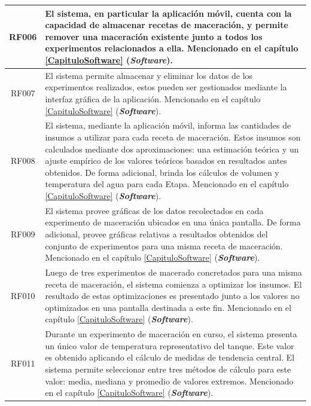 \begin{longtable}{|p{3cm}|p{11cm}|}
        \multicolumn{1}{|c|}{RF006}  & El sistema, en particular la aplicación móvil, cuenta con la capacidad de almacenar recetas de maceración, y permite remover una maceración existente junto a todos los experimentos relacionados a ella. Mencionado en el capítulo \ref{CapituloSoftware} (\textit{\textbf{Software}}). \\
        \hline
        
        \multicolumn{1}{|c|}{RF007} & El sistema permite almacenar y eliminar los datos de los experimentos realizados, estos pueden ser gestionados mediante la interfaz gráfica de la aplicación. Mencionado en el capítulo \ref{CapituloSoftware} (\textit{\textbf{Software}}). \\
        \hline
        
        \multicolumn{1}{|c|}{RF008} & El sistema, mediante la aplicación móvil, informa las cantidades de insumos a utilizar para cada receta de maceración. Estos insumos son calculados mediante dos aproximaciones: una estimación teórica y un ajuste empírico de los valores teóricos basados en resultados antes obtenidos. De forma adicional, brinda los cálculos de volumen y temperatura del agua para cada Etapa. Mencionado en el capítulo \ref{CapituloSoftware} (\textit{\textbf{Software}}). \\
        \hline 
        
        \multicolumn{1}{|c|}{RF009} & El sistema provee gráficas de los datos recolectados en cada experimento de maceración ubicados en una única pantalla. De forma adicional, provee gráficas relativas a resultados obtenidos del conjunto de experimentos para una misma receta de maceración. Mencionado en el capítulo \ref{CapituloSoftware} (\textit{\textbf{Software}}). \\
        \hline
        
        \multicolumn{1}{|c|}{RF010} & Luego de tres experimentos de macerado concretados para una misma receta de maceración, el sistema comienza a optimizar los insumos. El resultado de estas optimizaciones es presentado junto a los valores no optimizados en una pantalla destinada a este fin. Mencionado en el capítulo \ref{CapituloSoftware} (\textit{\textbf{Software}}). \\
        \hline
        
        \multicolumn{1}{|c|}{RF011} & Durante un experimento de maceración en curso, el sistema presenta un único valor de temperatura representativo del tanque. Este valor es obtenido aplicando el cálculo de medidas de tendencia central. El sistema permite seleccionar entre tres métodos de cálculo para este valor: media, mediana  y  promedio  de  valores extremos. Mencionado en el capítulo \ref{CapituloSoftware} (\textit{\textbf{Software}}). \\
        \hline
        

\end{longtable}
